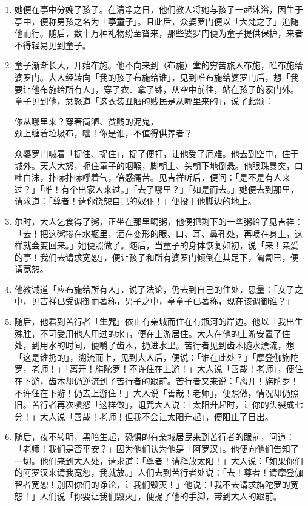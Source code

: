 \begin{enumerate}
\item 她便在亭中分娩了孩子。在清净之日，他们教人将她与孩子一起沐浴，因生于亭中，便称男孩之名为「\textbf{亭童子}」。且此后，众婆罗门便以「大梵之子」追随他而行。随后，数十万种礼物纷至沓来，那些婆罗门便为童子提供保护，来者不得轻易见到童子。
\item 童子渐渐长大，开始布施。他不向来到（布施）堂的穷苦旅人布施，唯布施给婆罗门。大人经转向「我的孩子布施给谁」，见到唯布施给婆罗门后，想「我要让他布施给所有人」，穿了衣、拿了钵，从空中前往，站在孩子的家门外。童子见到他，忿怒道「这衣装丑陋的贱民是从哪里来的」，说了此颂：\begin{quoting}你从哪里来？穿著简陋、贫贱的泥鬼，\\颈上缠着垃圾布，咄！你是谁，不值得供养者？\end{quoting}众婆罗门喊着「捉住、捉住」，捉了便打，让他受了厄难。他去到空中，住于城外。天人大怒，扼住童子的咽喉，脚朝上、头朝下地倒悬。他眼珠暴突，口吐白沫，扑哧扑哧呼着气，倍感痛苦。见吉祥听后，便问：「是不是有人来过？」「唯！有个出家人来过。」「去了哪里？」「如是而去。」她便去到那里，请求道：「尊者！请你饶恕自己的奴仆！」便投于他脚边的地上。
\item 尔时，大人乞食得了粥，正坐在那里喝粥，他便把剩下的一些粥给了见吉祥：「去！把这粥掺在水瓶里，洒在变形的眼、口、耳、鼻孔处，再喷在身上，这样就会变回来。」她便照做了。随后，当童子的身体恢复如初，说「来！亲爱的亭！我们去请求宽恕」，便让孩子和所有婆罗门倾倒在其足下，匍匐已，便请宽恕。
\item 他教诫道「应布施给所有人」，说了法论，仍去到自己的住处，思量：「女子之中，见吉祥已受调御而著称，男子之中，亭童子已著称，现在该调御谁？」
\item 随后，他看到苦行者「\textbf{生咒}」依止有亲城而住在有瓶河的岸边。他以「我出生殊胜，不可受用他人用过的水」，便在上游居住。大人在他的上游安置了住处，到用水的时间，便嚼了齿木，扔进水里。苦行者见到齿木随水漂流，想「这是谁扔的」，溯流而上，见到大人后，便说：「谁在此处？」「摩登伽旃陀罗，老师！」「离开！旃陀罗！不许住在上游！」大人说「善哉！老师」，便住在下游，齿木却仍逆流到了苦行者的跟前。苦行者又来说：「离开！旃陀罗！不许住在下游！仍去上游住！」大人说「善哉！老师」，便照做，情况却仍照旧。苦行者再次嗔怒「这样做」，诅咒大人说：「太阳升起时，让你的头裂成七分！」大人说「善哉！老师！但我不会让太阳升起」，便阻止了日出。
\item 随后，夜不转明，黑暗生起，恐惧的有亲城居民来到苦行者的跟前，问道：「老师！我们是否平安？」因为他们认为他是「阿罗汉」。他便向他们告知了一切。他们来到大人处，请求道：「尊者！请释放太阳！」大人说：「如果你们的阿罗汉来请我宽恕，我就放。」人们去到苦行者处说：「去！尊者！请摩登伽智者宽恕！别因你们的诤论，让我们毁灭！」他说：「我不去请求旃陀罗的宽恕！」人们说「你要让我们毁灭」，便捉了他的手脚，带到大人的跟前。

\end{enumerate}
